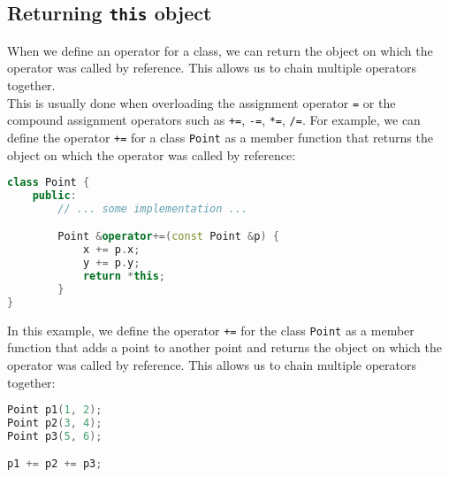 \subsection{Returning \texttt{this} object}

When we define an operator for a class, we can return the object on which the operator
was called by reference. This allows us to chain multiple operators together.\\

This is usually done when overloading the assignment operator \texttt{=} or the
compound assignment operators such as \texttt{+=}, \texttt{-=}, \texttt{*=}, \texttt{/=}.
For example, we can define the operator \texttt{+=} for a class \texttt{Point} as a
member function that returns the object on which the operator was called by reference:\\

\begin{lstlisting}[language=C++]
class Point {
    public:
        // ... some implementation ...

        Point &operator+=(const Point &p) {
            x += p.x;
            y += p.y;
            return *this;
        }
}
\end{lstlisting}

In this example, we define the operator \texttt{+=} for the class \texttt{Point} as a
member function that adds a point to another point and returns the object on which the
operator was called by reference. This allows us to chain multiple operators together:\\

\begin{lstlisting}[language=C++]
Point p1(1, 2);
Point p2(3, 4);
Point p3(5, 6);

p1 += p2 += p3;
\end{lstlisting}

